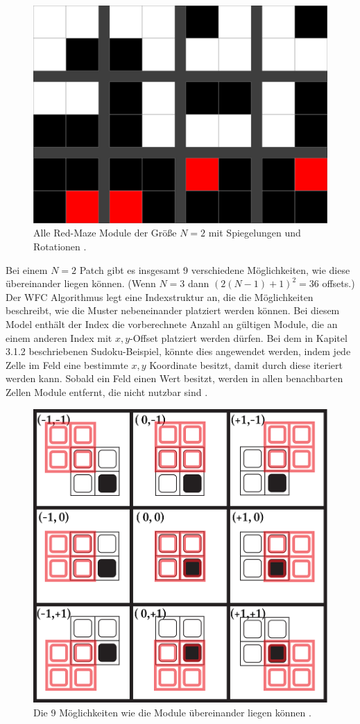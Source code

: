 \documentclass[12pt, a4paper,twoside,openright]{report} %
\begin{document}
\begin{figure}[H]
    \centering
    \includegraphics[width=0.5\linewidth]{images/red-maze-modules.jpg}%
    \caption{Alle Red-Maze Module der Größe $N = 2$ mit Spiegelungen und Rotationen \cite{Karth2017WaveFunctionCollapseIC}.}%
\end{figure}

Bei einem $N = 2$ Patch gibt es insgesamt 9 verschiedene Möglichkeiten, wie diese übereinander liegen können.
{(Wenn $N = 3$ dann $(2(N - 1) + 1)^2 = 36$ offsets.)}
Der WFC Algorithmus legt eine Indexstruktur an, die die Möglichkeiten beschreibt, wie die Muster nebeneinander platziert werden können.
Bei diesem Model enthält der Index die vorberechnete Anzahl an gültigen Module, die an einem anderen Index mit $x,y$-Offset platziert werden dürfen. 
Bei dem in Kapitel 3.1.2 beschriebenen Sudoku-Beispiel, könnte dies angewendet werden,
indem jede Zelle im Feld eine bestimmte $x,y$ Koordinate besitzt, damit durch diese iteriert werden kann.
Sobald ein Feld einen Wert besitzt, werden in allen benachbarten Zellen Module entfernt, die nicht nutzbar sind \cite{Karth2017WaveFunctionCollapseIC}.

\begin{figure}[H]
    \centering
    \includegraphics[width=0.5\linewidth]{images/red-maze-offset.png}%
    \caption{Die 9 Möglichkeiten wie die Module übereinander liegen können \cite{Karth2017WaveFunctionCollapseIC}.}%
\end{figure}
\end{document}

